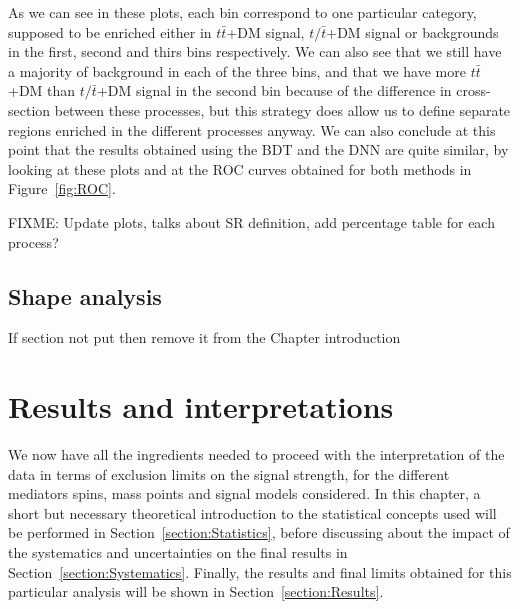 \documentclass[a4paper, 10pt, openright]{report}
\begin{document}
As we can see in these plots, each bin correspond to one particular category, supposed to be enriched either in $t \bar t$+DM signal, $t/\bar t$+DM signal or backgrounds in the first, second and thirs bins respectively. We can also see that we still have a majority of background in each of the three bins, and that we have more $t \bar t$+DM than $t/\bar t$+DM signal in the second bin because of the difference in cross-section between these processes, but this strategy does allow us to define separate regions enriched in the different processes anyway. We can also conclude at this point that the results obtained using the \ac{BDT} and the \ac{DNN} are quite similar, by looking at these plots and at the \ac{ROC} curves obtained for both methods in Figure~\ref{fig:ROC}.

\color{red}FIXME: Update plots, talks about SR definition, add percentage table for each process? \color{black}

\section{Shape analysis} \label{section:Shape}

\color{red} If section not put then remove it from the Chapter introduction \color{black}























\chapter{Results and interpretations} \label{chapter:FinalResults}

We now have all the ingredients needed to proceed with the interpretation of the data in terms of exclusion limits on the signal strength, for the different mediators spins, mass points and signal models considered. In this chapter, a short but necessary theoretical introduction to the statistical concepts used will be performed in Section~\ref{section:Statistics}, before discussing about the impact of the systematics and uncertainties on the final results in Section~\ref{section:Systematics}. Finally, the results and final limits obtained for this particular analysis will be shown in Section~\ref{section:Results}.
\end{document}
